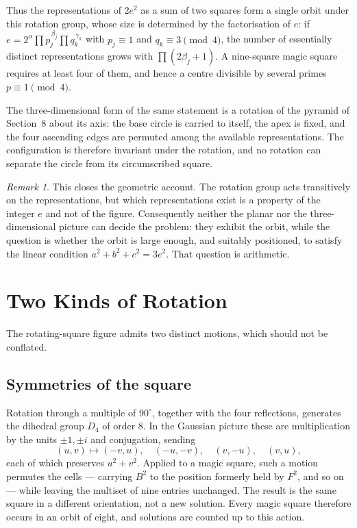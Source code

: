 \documentclass[12pt]{article}
\theoremstyle{remark}
\newtheorem{remark}[theorem]{Remark}
\begin{document}
Thus the representations of $2e^2$ as a sum of two squares form a
single orbit under this rotation group, whose size is determined by the
factorisation of $e$: if
$e = 2^{\alpha} \prod p_j^{\,\beta_j} \prod q_k^{\,\gamma_k}$ with
$p_j \equiv 1$ and $q_k \equiv 3 \pmod 4$, the number of essentially
distinct representations grows with $\prod (2\beta_j + 1)$. A
nine-square magic square requires at least four of them, and hence a
centre divisible by several primes $p \equiv 1 \pmod 4$.

The three-dimensional form of the same statement is a rotation of the
pyramid of Section~8 about its axis: the base circle is carried to
itself, the apex is fixed, and the four ascending edges are permuted
among the available representations. The configuration is therefore
invariant under the rotation, and no rotation can separate the circle
from its circumscribed square.

\begin{remark}
This closes the geometric account. The rotation group acts transitively
on the representations, but which representations exist is a property
of the integer $e$ and not of the figure. Consequently neither the
planar nor the three-dimensional picture can decide the problem: they
exhibit the orbit, while the question is whether the orbit is large
enough, and suitably positioned, to satisfy the linear condition
$a^2+b^2+c^2 = 3e^2$. That question is arithmetic.
\end{remark}
\section{Two Kinds of Rotation}

The rotating-square figure admits two distinct motions, which should
not be conflated.

\subsection*{Symmetries of the square}

Rotation through a multiple of $90^\circ$, together with the four
reflections, generates the dihedral group $D_4$ of order $8$. In the
Gaussian picture these are multiplication by the units
$\pm 1, \pm i$ and conjugation, sending
\[
(u,v) \longmapsto (-v,u), \quad (-u,-v), \quad (v,-u), \quad (v,u),
\]
each of which preserves $u^2+v^2$. Applied to a magic square, such a
motion permutes the cells --- carrying $B^2$ to the position formerly
held by $F^2$, and so on --- while leaving the multiset of nine entries
unchanged. The result is the same square in a different orientation,
not a new solution. Every magic square therefore occurs in an orbit of
eight, and solutions are counted up to this action.
\end{document}
